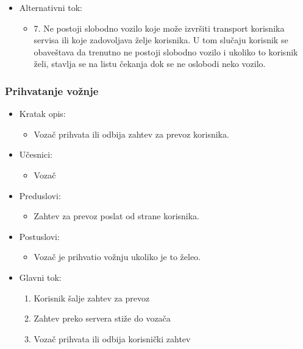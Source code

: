 \begin{itemize}
	\item Alternativni tok:
		\begin{itemize}
    		\item 7. Ne postoji slobodno vozilo koje može izvršiti transport korisnika servisa ili koje zadovoljava želje korisnika. U tom slučaju 
		    korisnik se obaveštava da trenutno ne postoji slobodno  vozilo i ukoliko to korisnik želi, stavlja se na listu čekanja dok se ne oslobodi neko vozilo.
		\end{itemize}
\end{itemize}

\subsubsection{\bfseries Prihvatanje vo\v znje}\begin{itemize}
	\item Kratak opis:
		\begin{itemize}
			\item Vozač prihvata ili odbija zahtev za prevoz korisnika.
		\end{itemize}
 
	\item Učesnici:
		\begin{itemize}
		    \item Vozač
		\end{itemize}				

	\item Preduslovi:
		\begin{itemize}
		    \item Zahtev za prevoz poslat od strane korisnika.
		\end{itemize}

	\item Postuslovi:
		\begin{itemize}
			\item Vozač je prihvatio vožnju ukoliko je to želeo.
		\end{itemize}		


	\item Glavni tok:
		\begin{enumerate}
		    \item Korisnik šalje zahtev za prevoz
		    \item Zahtev preko servera stiže do vozača
		    \item Vozač prihvata ili odbija korisnički zahtev
		\end{enumerate}
\end{itemize}

